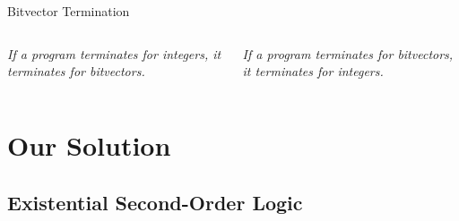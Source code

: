 \documentclass[xcolor=pdftex,t,11pt]{beamer}
\newcommand{\xmark}{\ding{55}}
\begin{document}
\begin{frame}[fragile]{Bitvector Termination}
 \begin{columns}[c]
  \emph{If a program terminates for integers, it terminates for bitvectors.}

  \uncover<2->{{\centering \color{red} \Huge \xmark
  
  }
  
  
  }

  \emph{If a program terminates for bitvectors, it terminates for integers.}

  \uncover<3->{{\centering \color{red} \Huge \xmark
  
  }
  
  
  }
 \end{columns}

 \vspace{1.5em}
 
 
\end{frame}

% 



\section{Our Solution}

\subsection{Existential Second-Order Logic}
\end{document}
